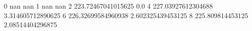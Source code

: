 0 nan nan
1 nan nan
2 223.72467041015625 0.0
4 227.03927612304688 3.314605712890625
6 226.32699584960938 2.602325439453125
8 225.809814453125 2.08514404296875
